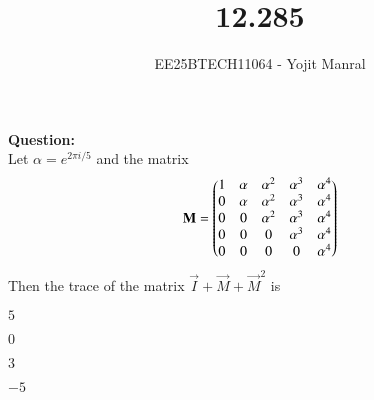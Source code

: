 \documentclass[journal]{IEEEtran}
\begin{document}

\vspace{3cm}

\title{12.285}
\author{EE25BTECH11064 - Yojit Manral}

\maketitle
{\let\newpage\relax\maketitle}
\renewcommand{\thefigure}{\theenumi}
\renewcommand{\thetable}{\theenumi}
\setlength{\intextsep}{10pt} %

\textbf{Question:}\\
Let $\alpha = e^{2\pi i/5}$ and the matrix
\begin{align}
    \mathbf{M} = \begin{pmatrix}1&\alpha&\alpha^2&\alpha^3&\alpha^4\\0&\alpha&\alpha^2&\alpha^3&\alpha^4\\0&0&\alpha^2&\alpha^3&\alpha^4\\0&0&0&\alpha^3&\alpha^4\\0&0&0&0&\alpha^4\end{pmatrix}
\end{align}
Then the trace of the matrix $\vec{I} + \vec{M} + \vec{M}^2$ is
\begin{enumerate}[label=(\alph*)]
\begin{multicols}{4}
    \item $5$
    \item $0$
    \item $3$
    \item $-5$
\end{multicols}
\end{enumerate}
\end{document}
